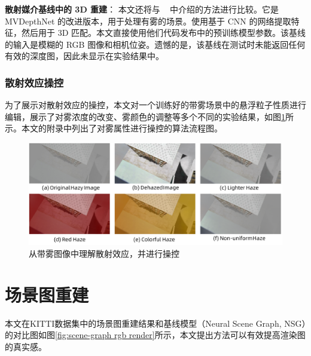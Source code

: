 \textbf{散射媒介基线中的 3D 重建}：
本文还将与 ~\cite{fujimura_dehazing_2021} 中介绍的方法进行比较。它是 MVDepthNet 的改进版本，用于处理有雾的场景。使用基于 CNN 的网络提取特征，然后用于 3D 匹配。本文直接使用他们代码发布中的预训练模型参数。该基线的输入是模糊的 RGB 图像和相机位姿。遗憾的是，该基线在测试时未能返回任何有效的深度图，因此未显示在实验结果中。



\subsubsection{散射效应操控}
为了展示对散射效应的操控，本文对一个训练好的带雾场景中的悬浮粒子性质进行编辑，展示了对雾浓度的改变、雾颜色的调整等多个不同的实验结果，如图\ref{fig:dehazenerf-manipulation}所示。本文的附录中列出了对雾属性进行操控的算法流程图。

\begin{figure}[ht]
    \centering
    \includegraphics[width=\textwidth]{undergraduate-thesis/images/experiments/haze-manipulation.pdf}
    \caption{从带雾图像中理解散射效应，并进行操控}
    \label{fig:dehazenerf-manipulation}
\end{figure}

\newpage
\section{场景图重建}
本文在KITTI数据集中的场景图重建结果和基线模型（Neural Scene Graph, NSG\cite{ost_neural_2021}）的对比图如图\ref{fig:scene-graph rgb render}所示，本文提出方法可以有效提高渲染图的真实感。

\begin{table}[ht]
\centering
{}
\caption{场景图模型的数值对比结果}
\label{tab:scene-graphs}
\end{table}

